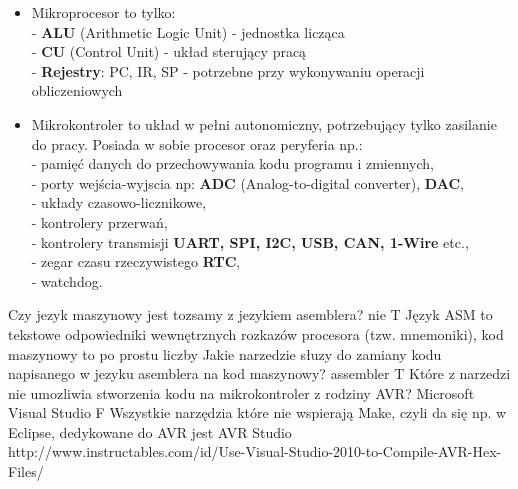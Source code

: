 {\begin{itemize}
\item Mikroprocesor to tylko:\\- \textbf{ALU} (Arithmetic Logic Unit) - jednostka licząca\\ - \textbf{CU} (Control Unit) - układ sterujący pracą\\ - \textbf{Rejestry}: PC, IR, SP - potrzebne przy wykonywaniu operacji obliczeniowych\\
\item Mikrokontroler to układ w pełni autonomiczny, potrzebujący tylko zasilanie do pracy. Posiada w sobie procesor oraz peryferia np.:\\- pamięć danych do przechowywania kodu programu i zmiennych,\\- porty wejścia-wyjscia np: \textbf{ADC} (Analog-to-digital converter), \textbf{DAC},\\- układy czasowo-licznikowe, \\- kontrolery przerwań,\\- kontrolery transmisji\textbf{ UART, SPI, I2C, USB, CAN, 1-Wire} etc.,\\- zegar czasu rzeczywistego \textbf{RTC},\\- watchdog.
\end{itemize}}
\answer
{Czy jezyk maszynowy jest tozsamy z jezykiem asemblera? }
{nie}
{T}
{}
{Język ASM to tekstowe odpowiedniki wewnętrznych rozkazów procesora (tzw. mnemoniki), kod maszynowy to po prostu liczby}
\answer
{Jakie narzedzie słuzy do zamiany kodu napisanego w jezyku asemblera na kod maszynowy? }
{assembler}
{T}
{}
{}
\answer
{Które z narzedzi nie umozliwia stworzenia kodu na mikrokontroler z rodziny AVR?}
{Microsoft Visual Studio
}
{F}
{Wszystkie narzędzia które nie wspierają Make, czyli da się np. w Eclipse, dedykowane do AVR jest AVR Studio}
{http://www.instructables.com/id/Use-Visual-Studio-2010-to-Compile-AVR-Hex-Files/}
